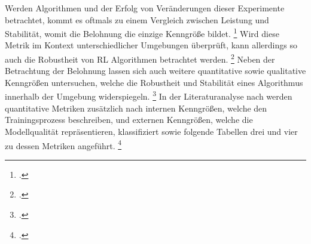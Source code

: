 Werden Algorithmen und der Erfolg von Veränderungen dieser Experimente betrachtet, kommt es oftmals zu einem Vergleich zwischen Leistung und Stabilität, womit die Belohnung die einzige Kenngröße bildet. \footcite[Vgl.][S. 6]{YanDuan.2016}
Wird diese Metrik im Kontext unterschiedlicher Umgebungen überprüft, kann allerdings so auch die Robustheit von RL Algorithmen betrachtet werden. \footcite[Vgl.][S. 6]{Pinto.2017}
Neben der Betrachtung der Belohnung lassen sich auch weitere quantitative sowie qualitative Kenngrößen untersuchen, welche die Robustheit und Stabilität eines Algorithmus innerhalb der Umgebung widerspiegeln. \footcite[Vgl.][S. 15]{Pullum.2022}
In der Literaturanalyse nach \cite[]{Pullum.2022} werden quantitative Metriken zusätzlich nach internen Kenngrößen, welche den Trainingsprozess beschreiben, und externen Kenngrößen, welche die Modellqualität repräsentieren, klassifiziert sowie folgende Tabellen drei und vier zu dessen Metriken angeführt. \footcite[Vgl.][S. 16]{Pullum.2022}

